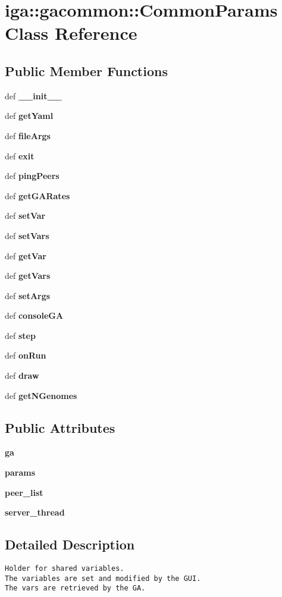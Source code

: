 \section{iga::gacommon::CommonParams Class Reference}
\label{classiga_1_1gacommon_1_1CommonParams}
\subsection*{Public Member Functions}
\begin{CompactItemize}
\item 
def {\bf \_\-\_\-init\_\-\_\-}
\item 
def {\bf getYaml}
\item 
def {\bf fileArgs}
\item 
def {\bf exit}
\item 
def {\bf pingPeers}
\item 
def {\bf getGARates}
\item 
def {\bf setVar}
\item 
def {\bf setVars}
\item 
def {\bf getVar}
\item 
def {\bf getVars}
\item 
def {\bf setArgs}
\item 
def {\bf consoleGA}
\item 
def {\bf step}
\item 
def {\bf onRun}
\item 
def {\bf draw}
\item 
def {\bf getNGenomes}
\end{CompactItemize}
\subsection*{Public Attributes}
\begin{CompactItemize}
\item 
{\bf ga}
\item 
{\bf params}
\item 
{\bf peer\_\-list}
\item 
{\bf server\_\-thread}
\end{CompactItemize}


\subsection{Detailed Description}


\footnotesize\begin{verbatim}
Holder for shared variables.
The variables are set and modified by the GUI.
The vars are retrieved by the GA.
\end{verbatim}
\normalsize
 

